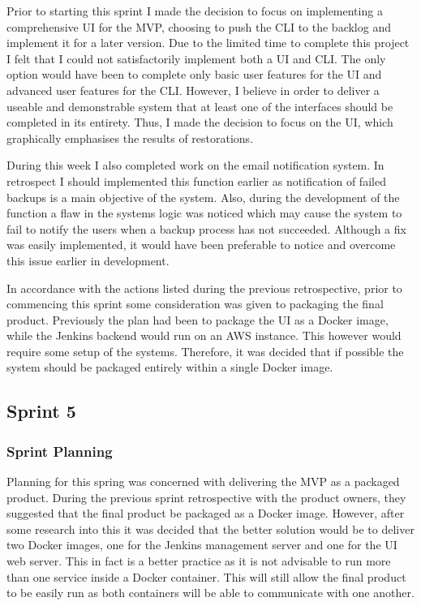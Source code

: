     Prior to starting this sprint I made the decision to focus on implementing a comprehensive UI for the MVP, choosing to push the CLI to the backlog and implement it for a later version. Due to the limited time to complete this project I felt that I could not satisfactorily implement both a UI and CLI. The only option would have been to complete only basic user features for the UI and advanced user features for the CLI. However, I believe in order to deliver a useable and demonstrable system that at least one of the interfaces should be completed in its entirety. Thus, I made the decision to focus on the UI, which graphically emphasises the results of restorations.
   
    During this week I also completed work on the email notification system. In retrospect I should implemented this function earlier as notification of failed backups is a main objective of the system. Also, during the development of the function a flaw in the systems logic was noticed which may cause the system to fail to notify the users when a backup process has not succeeded. Although a fix was easily implemented, it would have been preferable to notice and overcome this issue earlier in development.
    
   In accordance with the actions listed during the previous retrospective, prior to commencing this sprint some consideration was given to packaging the final product. Previously the plan had been to package the UI as a Docker image, while the Jenkins backend would run on an AWS instance. This however would require some setup of the systems. Therefore, it was decided that if possible the system should be packaged entirely within a single Docker image.
   
	\subsection{Sprint 5}
  \subsubsection{Sprint Planning}
  Planning for this spring was concerned with delivering the MVP as a packaged product. During the previous sprint retrospective with the product owners, they suggested that the final product be packaged as a Docker image. However, after some research into this it was decided that the better solution would be to deliver two Docker images, one for the Jenkins management server and one for the UI web server. This in fact is a better practice as it is not advisable to run more than one service inside a Docker container. This will still allow the final product to be easily run as both containers will be able to communicate with one another.
  
